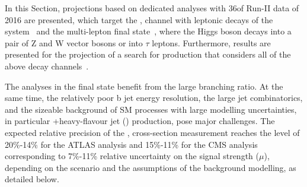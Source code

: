 In this Section, projections based on dedicated analyses with 36\fbinv of Run-II data of 2016 are presented, which target the \ttH, \Htobb channel with leptonic decays of the \ttbar system~\cite{Aaboud:2017rss,Sirunyan:2018mvw} and the \ttH multi-lepton final state~\cite{Aaboud:2017jvq}, where the Higgs boson decays into a pair of Z and W vector bosons or into $\tau$ leptons.
Furthermore, results are presented for the projection of a search for \tH production that considers all of the above decay channels~\cite{Sirunyan:2018lzm}.



The \ttH analyses in the \Htobb final state benefit from the large branching ratio.
At the same time, the relatively poor b jet energy resolution, the large jet combinatorics, and the sizeable background of SM processes with large modelling uncertainties, in particular \ttbar+heavy-flavour jet (\ttHF) production, pose major challenges.
The expected relative precision of the \ttH, \Htobb cross-section measurement reaches the level of 20\%-14\% for the ATLAS analysis and 15\%-11\% for the CMS analysis ~\cite{ATLAS-PHYS-PUB-2018-XY,CMS-PAS-FTR-18-011} corresponding to 7\%-11\% relative uncertainty on the signal strength ($\mu$), depending on the scenario and the assumptions of the \ttHF background modelling, as detailed below.

